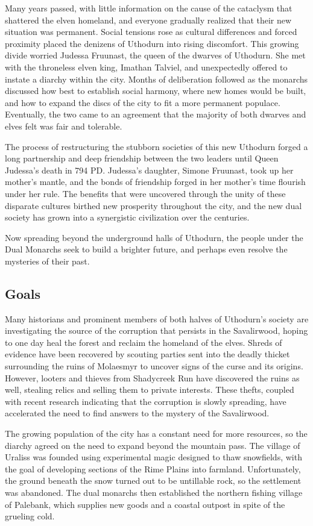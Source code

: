 \documentclass[10pt,a4paper,twoside,bg=print,twocolumn,openany,nodeprecatedcode]{dndbook}
\begin{document}
Many years passed, with little information on the cause of the cataclysm that shattered the elven homeland, and everyone gradually realized that their new situation was permanent. Social tensions rose as cultural differences and forced proximity placed the denizens of Uthodurn into rising discomfort. This growing divide worried Judessa Fruunast, the queen of the dwarves of Uthodurn. She met with the throneless elven king, Imathan Talviel, and unexpectedly offered to instate a diarchy within the city. Months of deliberation followed as the monarchs discussed how best to establish social harmony, where new homes would be built, and how to expand the discs of the city to fit a more permanent populace. Eventually, the two came to an agreement that the majority of both dwarves and elves felt was fair and tolerable.

The process of restructuring the stubborn societies of this new Uthodurn forged a long partnership and deep friendship between the two leaders until Queen Judessa's death in 794 PD. Judessa's daughter, Simone Fruunast, took up her mother's mantle, and the bonds of friendship forged in her mother's time flourish under her rule. The benefits that were uncovered through the unity of these disparate cultures birthed new prosperity throughout the city, and the new dual society has grown into a synergistic civilization over the centuries.

Now spreading beyond the underground halls of Uthodurn, the people under the Dual Monarchs seek to build a brighter future, and perhaps even resolve the mysteries of their past.

\subsection{Goals}
Many historians and prominent members of both halves of Uthodurn's society are investigating the source of the corruption that persists in the Savalirwood, hoping to one day heal the forest and reclaim the homeland of the elves. Shreds of evidence have been recovered by scouting parties sent into the deadly thicket surrounding the ruins of Molaesmyr to uncover signs of the curse and its origins. However, looters and thieves from Shadycreek Run have discovered the ruins as well, stealing relics and selling them to private interests. These thefts, coupled with recent research indicating that the corruption is slowly spreading, have accelerated the need to find answers to the mystery of the Savalirwood.

The growing population of the city has a constant need for more resources, so the diarchy agreed on the need to expand beyond the mountain pass. The village of Uraliss was founded using experimental magic designed to thaw snowfields, with the goal of developing sections of the Rime Plains into farmland. Unfortunately, the ground beneath the snow turned out to be untillable rock, so the settlement was abandoned. The dual monarchs then established the northern fishing village of Palebank, which supplies new goods and a coastal outpost in spite of the grueling cold.
\end{document}
